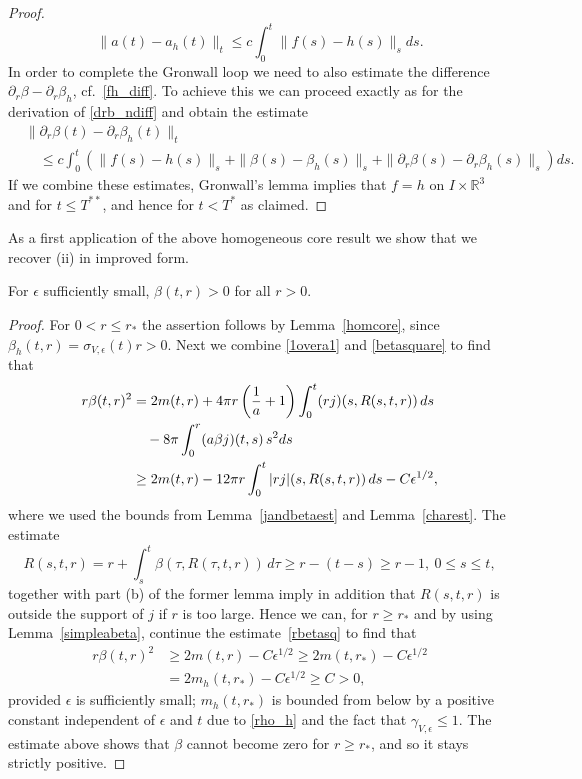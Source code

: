 \documentclass[11pt]{article}
\def\R{\mathbb R}
\begin{document}
\begin{proof}
  \[
  \|a(t) - a_h(t)\|_t \leq c \int_0^t \|f(s)-h(s)\|_s ds.
  \]
  In order to complete the Gronwall loop we need to also estimate
  the difference $\partial_r\beta - \partial_r\beta_h$, cf.~\eqref{fh_diff}.
  To achieve this we can proceed exactly as for the derivation
  of \eqref{drb_ndiff} and obtain the estimate
  \begin{align*}
    &\|\partial_r \beta(t) - \partial_r \beta_h(t)\|_t \\
    &\quad \leq
    c \int_0^t\left(\|f(s)-h(s)\|_s
    + \|\beta(s)-\beta_h(s)\|_s +
    \|\partial_r\beta(s)-\partial_r\beta_h(s)\|_s\right) ds.
  \end{align*}
  If we combine these estimates, Gronwall's lemma implies that
  $f=h$ on $I\times \R^3$ and for $t\leq T^{\ast\ast}$, and hence
  for $t < T^\ast$ as claimed.
\end{proof}


As a first application of the above homogeneous core result we
show that we recover (ii) in improved form.

\begin{lemma}\label{betapos}
  For $\epsilon$ sufficiently small,
  $\beta(t,r) >0$ for all $r>0$.
\end{lemma}
%
\begin{proof}
  For $0<r\leq r_\ast$ the assertion follows by Lemma~\ref{homcore},
  since $\beta_h(t,r) = \sigma_{V,\epsilon}(t) r > 0$. Next we combine
  \eqref{1overa1} and \eqref{betasquare} to find that
  \begin{align}\label{rbetasq}
    r \beta(t,r)^2
    & =
    2 m(t,r)
    + 4 \pi r \left(\frac{1}{a}+1\right) \int_0^t(r j)(s,R(s,t,r))\, ds\notag\\
    &
    \quad {}- 8\pi \int_0^r (a \beta j)(t,s)\, s^2 ds\notag\\
    & \geq
    2 m(t,r) - 12 \pi r \int_0^t |r j|(s,R(s,t,r))\, ds - C \epsilon^{1/2},
  \end{align}
  where we used the bounds from Lemma~\ref{jandbetaest} and
  Lemma~\ref{charest}. The estimate
  \[
  R(s,t,r) = r + \int_s^t \beta(\tau,R(\tau,t,r))\, d\tau
  \geq r -(t-s) \geq r-1,\ 0\leq s\leq t, 
  \]
  together with part (b) of the former lemma imply in addition
  that $R(s,t,r)$ is outside the support of $j$ if $r$ is too large.
  Hence we can, for $r \geq  r_\ast$ and by using Lemma~\ref{simpleabeta}, 
  continue the estimate~\eqref{rbetasq} 
  to find that
  \begin{align*}
    r \beta(t,r)^2
    &\geq
    2 m(t,r) - C \epsilon^{1/2} \geq 2 m(t,r_\ast) - C \epsilon^{1/2}\\
    & = 2 m_h(t,r_\ast) - C \epsilon^{1/2} \geq C > 0,
  \end{align*}
  provided $\epsilon$ is sufficiently small;
  $m_h(t,r_\ast)$ is bounded from below
  by a positive constant independent of $\epsilon$ and $t$
  due to \eqref{rho_h} and the fact that
  $\gamma_{V,\epsilon} \leq 1$.
  The estimate above shows that $\beta$ cannot become zero
  for $r \geq  r_\ast$, and so it stays strictly positive. 
\end{proof}
\end{document}
